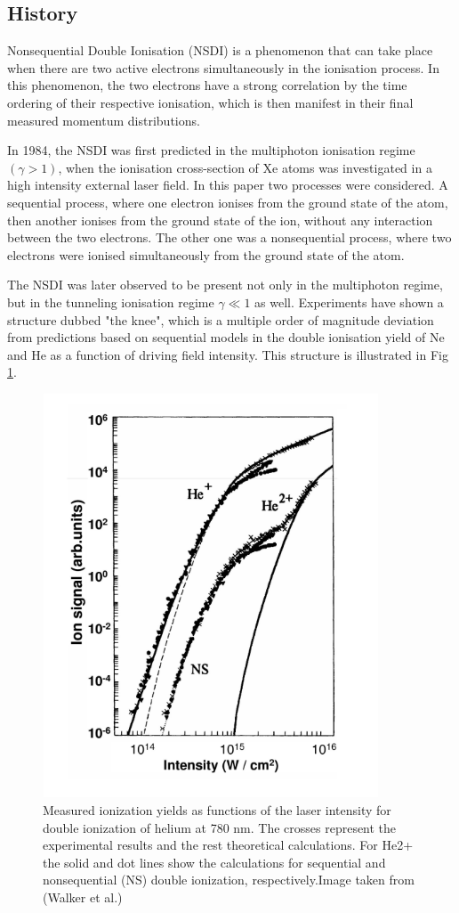 \documentclass[11pt]{article}
\numberwithin{equation}{section}
\begin{document}
\subsection{History}
Nonsequential Double Ionisation (NSDI) is a phenomenon that can take place when there are two active electrons simultaneously in the ionisation process. In this phenomenon, the two electrons have a strong correlation by the time ordering of their respective ionisation, which is then manifest in their final measured momentum distributions.
\par
In 1984, the NSDI was first predicted\cite{lhuillier_1983_multiply} in the multiphoton ionisation regime $(\gamma > 1)$, when the ionisation cross-section of Xe atoms was investigated in a high intensity external laser field. In this paper two processes were considered. A sequential process, where one electron ionises from the ground state of the atom, then another ionises from the ground state of the ion, without any interaction between the two electrons. The other one was a nonsequential process, where two electrons were ionised simultaneously from the ground state of the atom.
\par
The NSDI was later observed to be present not only in the multiphoton regime, but in the tunneling ionisation regime $\gamma \ll 1$ as well. Experiments have shown a structure dubbed "the knee"\cite{walker_1994_precision}, which is a multiple order of magnitude deviation from predictions based on sequential models in the double ionisation yield of Ne and He as a function of driving field intensity. This structure is illustrated in Fig \ref{fig:knee}.
\begin{figure}[!htb]
    \centering
    \includegraphics[width=10cm, height=12cm]{Figures/theKnee.png}
    \caption{Measured ionization yields as functions of the laser intensity for double ionization of helium at 780 nm. The crosses represent the experimental results and the rest theoretical calculations. For He2+ the solid and dot lines show the calculations for sequential and nonsequential (NS) double ionization, respectively.Image taken from (Walker et al.)\cite{walker_1994_precision}}
    \label{fig:knee}
\end{figure}
\end{document}

